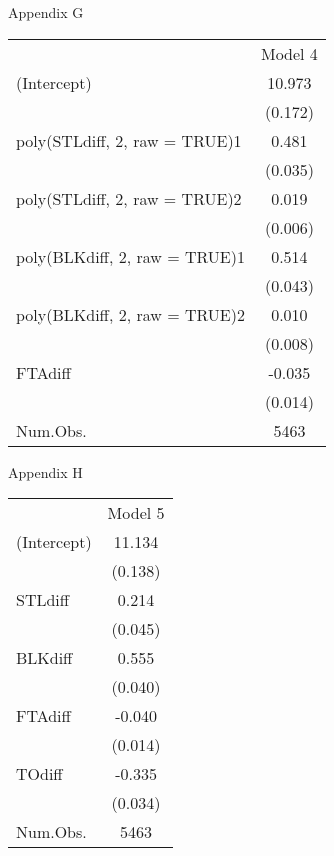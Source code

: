\documentclass{article}
\begin{document}
\newpage
Appendix G
\begin{table}
\centering
\begin{tabular}[t]{lc}
  & Model 4\\
(Intercept) & 10.973\\
 & (0.172)\\
poly(STLdiff, 2, raw = TRUE)1 & 0.481\\
 & (0.035)\\
poly(STLdiff, 2, raw = TRUE)2 & 0.019\\
 & (0.006)\\
poly(BLKdiff, 2, raw = TRUE)1 & 0.514\\
 & (0.043)\\
poly(BLKdiff, 2, raw = TRUE)2 & 0.010\\
 & (0.008)\\
FTAdiff & -0.035\\
 & (0.014)\\
Num.Obs. & 5463\\
\end{tabular}
\end{table}
\newpage
Appendix H
\begin{table}
\centering
\begin{tabular}[t]{lc}
  & Model 5\\
(Intercept) & 11.134\\
 & (0.138)\\
STLdiff & 0.214\\
 & (0.045)\\
BLKdiff & 0.555\\
 & (0.040)\\
FTAdiff & -0.040\\
 & (0.014)\\
TOdiff & -0.335\\
 & (0.034)\\
Num.Obs. & 5463\\
\end{tabular}
\end{table}
\end{document}
